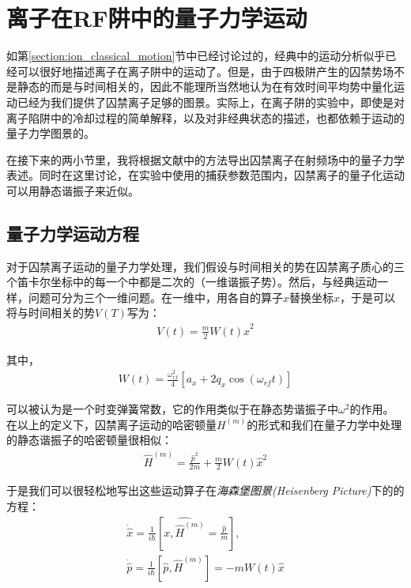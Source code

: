 \section[离子在RF阱中的量子力学运动]{离子在RF阱中的量子力学运动\label{section:quantum_motion}}

如第\ref{section:ion_classical_motion}节中已经讨论过的，经典中的运动分析似乎已经可以很好地描述离子在离子阱中的运动了。但是，由于四极阱产生的囚禁势场不是静态的而是与时间相关的，因此不能理所当然地认为在有效时间平均势中量化运动已经为我们提供了囚禁离子足够的图景。实际上，在离子阱的实验中，即使是对离子陷阱中的冷却过程的简单解释，以及对非经典状态的描述，也都依赖于运动的量子力学图景的。

在接下来的两小节里，我将根据文献\cite[]{Arimondo_Phillips_Strumia_1992}中的方法导出囚禁离子在射频场中的量子力学表述。同时在这里讨论，在实验中使用的捕获参数范围内，囚禁离子的量子化运动可以用静态谐振子来近似。

\subsection[量子力学运动方程]{量子力学运动方程}
对于囚禁离子运动的量子力学处理，我们假设与时间相关的势在囚禁离子质心的三个笛卡尔坐标中的每一个中都是二次的（一维谐振子势\cite[]{Solimeno_Di_Porto_Crosignani}）。然后，与经典运动一样，问题可分为三个一维问题。在一维中，用各自的算子$\hat{x}$替换坐标$x$，于是可以将与时间相关的势$V(T)$写为：
\begin{align}
    V(t)=\frac{m}{2}W(t)\hat{x}^2
\end{align}

其中，
\begin{align}
    W(t)=\frac{\omega_{rf}^2}{4}\left[a_x+2q_x\cos(\omega_{rf}t)\right]
\end{align}

可以被认为是一个时变弹簧常数，它的作用类似于在静态势谐振子中$\omega^2$的作用。在以上的定义下，囚禁离子运动的哈密顿量$H^{(m)}$的形式和我们在量子力学中处理的静态谐振子的哈密顿量很相似：
\begin{align}
    \hat{H}^{(m)}=\frac{\hat{p}^2}{2m}+\frac{m}{2}W(t)\hat{x}^2\label{eq:static_harmiltonian_oscillator}
\end{align}

于是我们可以很轻松地写出这些运动算子在\emph{海森堡图景(Heisenberg Picture)}下的的方程：
\begin{align}
    \dot{\hat{x}}= \frac{1}{i\hbar}\left[\hat{x,\hat{H}^{(m)}}=\frac{\hat{p}}{m}\right],\\
    \dot{\hat{p}}= \frac{1}{i\hbar}\left[\hat{p},\hat{H}^{(m)}\right]=-mW(t)\hat{x}
\end{align}

